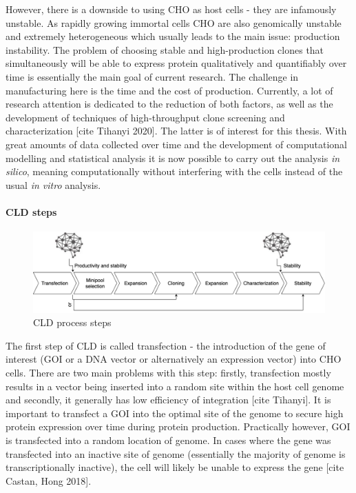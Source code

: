 However, there is a downside to using CHO as host cells - they are infamously unstable. As rapidly growing immortal cells CHO are also genomically unstable and extremely heterogeneous which usually leads to the main issue: production instability. The problem of choosing stable and high-production clones that simultaneously will be able to express protein qualitatively and quantifiably over time is essentially the main goal of current research. The challenge in manufacturing here is the time and the cost of production. Currently, a lot of research attention is dedicated to the reduction of both factors, as well as the development of techniques of high-throughput clone screening and characterization [cite Tihanyi 2020]. The latter is of interest for this thesis. With great amounts of data collected over time and the development of computational modelling and statistical analysis it is now possible to carry out the analysis \textit{in silico}, meaning computationally without interfering with the cells instead of the usual \textit{in vitro} analysis.

\paragraph{CLD steps}
\begin{figure}[H]
	\begin{center}
		\includegraphics[width=0.8\linewidth]{bilder/CLD.png}
		\caption{CLD process steps}\label{fig:cls-steps}
	\end{center}
\end{figure}

The first step of CLD is called transfection - the introduction of the gene of interest (GOI or a DNA vector or alternatively an expression vector) into CHO cells. There are two main problems with this step: firstly, transfection mostly results in a vector being inserted into a random site within the host cell genome and secondly, it generally has low efficiency of integration [cite Tihanyi]. It is important to transfect a GOI into the optimal site of the genome to secure high protein expression over time during protein production. Practically however, GOI is transfected into a random location of genome. In cases where the gene was transfected into an inactive site of genome (essentially the majority of genome is transcriptionally inactive), the cell will likely be unable to express the gene [cite Castan, Hong 2018].

